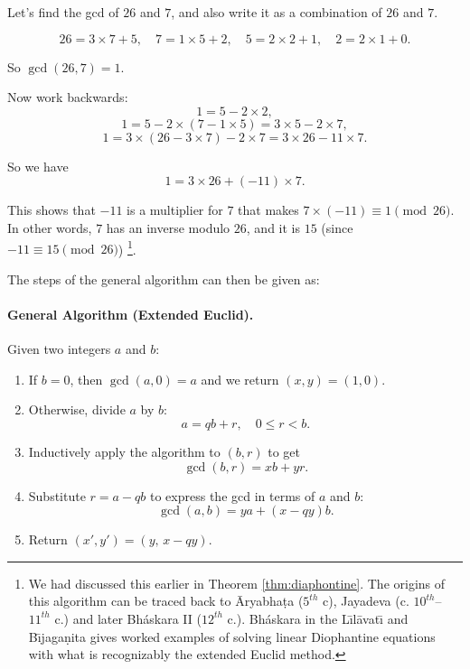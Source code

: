 \begin{example}
Let’s find the gcd of $26$ and $7$, and also write it as a combination of $26$ and $7$.

\[
26 = 3 \times 7 + 5, \quad
7 = 1 \times 5 + 2, \quad
5 = 2 \times 2 + 1, \quad
2 = 2 \times 1 + 0.
\]

So $\gcd(26,7)=1$.  

Now work backwards:
\[
1 = 5 - 2 \times 2,
\]
\[
1 = 5 - 2 \times (7 - 1 \times 5) = 3 \times 5 - 2 \times 7,
\]
\[
1 = 3 \times (26 - 3 \times 7) - 2 \times 7 = 3 \times 26 - 11 \times 7.
\]

So we have
\[
1 = 3 \times 26 + (-11) \times 7.
\]

This shows that $-11$ is a multiplier for $7$ that makes $7 \times (-11) \equiv 1 \pmod{26}$.  
In other words, $7$ has an inverse modulo $26$, and it is $15$ (since $-11 \equiv 15 \pmod{26}$) \footnote{We had discussed this earlier in Theorem \ref{thm:diaphontine}. The origins of this algorithm can be traced back to  \={A}ryabha\d{t}a ($5^{th}$ c), Jayadeva (c. $10^{th}$–$11^{th}$ c.) and later Bh\'{a}skara II ($12^{th}$ c.). Bh\'{a}skara in the L\={\i}l\={a}vat\={\i} and B\={\i}jaga\d{n}ita gives worked examples of solving linear Diophantine equations with what is recognizably the extended Euclid method.}.  
\end{example}

The steps of the general algorithm can then be given as:

\paragraph{General Algorithm (Extended Euclid).}

\label{algo:extended-Euclid}
Given two integers $a$ and $b$:

\begin{enumerate}
\item If $b=0$, then $\gcd(a,0)=a$ and we return $(x,y)=(1,0)$.
\item Otherwise, divide $a$ by $b$: 
\[
a = q b + r, \quad 0 \leq r < b.
\]
\item Inductively apply the algorithm to $(b,r)$ to get
\[
\gcd(b,r) = xb + yr.
\]
\item Substitute $r=a - qb$ to express the gcd in terms of $a$ and $b$:
\[
\gcd(a,b) = y a + (x - qy)b.
\]
\item Return $(x',y')=(y,\,x-qy)$.
\end{enumerate}

